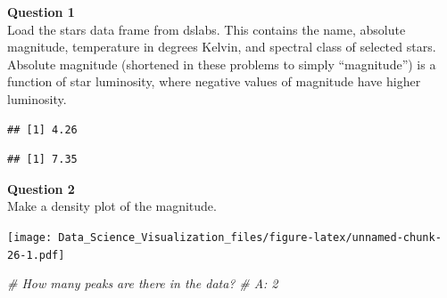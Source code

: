 \documentclass[
]{article}
\newenvironment{Shaded}{\begin{snugshade}}{\end{snugshade}}
\newcommand{\CommentTok}[1]{\textcolor[rgb]{0.56,0.35,0.01}{\textit{#1}}}
\newcommand{\KeywordTok}[1]{\textcolor[rgb]{0.13,0.29,0.53}{\textbf{#1}}}
\newcommand{\NormalTok}[1]{#1}
\newcommand{\OperatorTok}[1]{\textcolor[rgb]{0.81,0.36,0.00}{\textbf{#1}}}
\newcommand{\StringTok}[1]{\textcolor[rgb]{0.31,0.60,0.02}{#1}}
\begin{document}
\textbf{Question 1}\\
Load the stars data frame from dslabs. This contains the name, absolute
magnitude, temperature in degrees Kelvin, and spectral class of selected
stars. Absolute magnitude (shortened in these problems to simply
``magnitude'') is a function of star luminosity, where negative values
of magnitude have higher luminosity.

\begin{Shaded}
\end{Shaded}

\begin{verbatim}
## [1] 4.26
\end{verbatim}

\begin{Shaded}
\end{Shaded}

\begin{verbatim}
## [1] 7.35
\end{verbatim}

\textbf{Question 2}\\
Make a density plot of the magnitude.

\begin{Shaded}
\end{Shaded}

\texttt{[image: Data\_Science\_Visualization\_files/figure-latex/unnamed-chunk-26-1.pdf]}

\begin{Shaded}
\begin{Highlighting}[]
\CommentTok{# How many peaks are there in the data?}
\CommentTok{# A: 2}
\end{Highlighting}
\end{Shaded}
\end{document}
